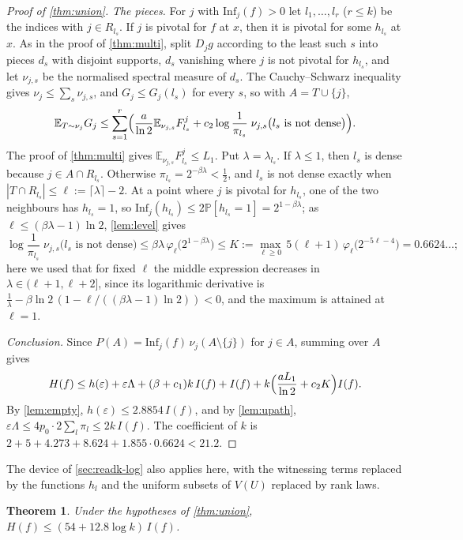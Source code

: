 \documentclass[11pt]{amsart}
\newtheorem{theorem}{Theorem}[section]
\theoremstyle{definition}
\theoremstyle{remark}
\newcommand{\E}{\mathbb{E}}
\renewcommand{\Pr}{\mathbb{P}}
\newcommand{\Inf}{\mathrm{Inf}}
\begin{document}
\begin{proof}[Proof of \cref{thm:union}]
\emph{The pieces.} For $j$ with $\Inf_j(f)>0$ let $l_1,\dots,l_r$ ($r\le k$) be the indices with $j\in R_{l_s}$. If
$j$ is pivotal for $f$ at $x$, then it is pivotal for some $h_{l_s}$ at $x$. As in the proof of \cref{thm:multi},
split $D_jg$ according to the least such $s$ into pieces $d_s$ with disjoint supports, $d_s$ vanishing where $j$ is
not pivotal for $h_{l_s}$, and let $\nu_{j,s}$ be the normalised spectral measure of $d_s$. The Cauchy--Schwarz
inequality gives $\nu_j\le\sum_s\nu_{j,s}$, and $G_j\le G_j(l_s)$ for every $s$, so with $A=T\cup\{j\}$,
\[
\E_{T\sim\nu_j}G_j\le\sum_{s=1}^r\Bigl(\frac a{\ln2}\E_{\nu_{j,s}}F^j_{l_s}+c_2\log\frac1{\pi_{l_s}}\;
\nu_{j,s}\bigl(l_s\text{ is not dense}\bigr)\Bigr).
\]
The proof of \cref{thm:multi} gives $\E_{\nu_{j,s}}F^j_{l_s}\le L_1$. Put $\lambda=\lambda_{l_s}$. If $\lambda\le1$, then
$l_s$ is dense because $j\in A\cap R_{l_s}$. Otherwise $\pi_{l_s}=2^{-\beta\lambda}<\frac12$, and $l_s$ is not dense
exactly when $|T\cap R_{l_s}|\le\ell:=\lceil\lambda\rceil-2$. At a point where $j$ is pivotal for $h_{l_s}$, one of
the two neighbours has $h_{l_s}=1$, so $\Inf_j(h_{l_s})\le2\Pr[h_{l_s}=1]=2^{1-\beta\lambda}$; as
$\ell\le(\beta\lambda-1)\ln2$, \cref{lem:level} gives
\[
\log\frac1{\pi_{l_s}}\;\nu_{j,s}\bigl(l_s\text{ is not dense}\bigr)\le\beta\lambda\,\varphi_\ell\bigl(2^{1-\beta\lambda}\bigr)
\le K:=\max_{\ell\ge0}\,5(\ell+1)\,\varphi_\ell\bigl(2^{-5\ell-4}\bigr)=0.6624\ldots;
\]
here we used that for fixed $\ell$ the middle expression decreases in $\lambda\in(\ell+1,\ell+2]$, since its
logarithmic derivative is $\frac1\lambda-\beta\ln2\,(1-\ell/((\beta\lambda-1)\ln2))<0$, and the maximum is attained at
$\ell=1$.

\emph{Conclusion.} Since $P(A)=\Inf_j(f)\,\nu_j(A\setminus\{j\})$ for $j\in A$, summing over $A$ gives
\[
H(f)\le h(\varepsilon)+\varepsilon\Lambda+(\beta+c_1)k\,I(f)+I(f)+k\Bigl(\frac{aL_1}{\ln2}+c_2K\Bigr)I(f).
\]
By \cref{lem:empty}, $h(\varepsilon)\le2.8854\,I(f)$, and by \cref{lem:upath},
$\varepsilon\Lambda\le4p_0\cdot2\sum_l\pi_l\le2k\,I(f)$. The coefficient of $k$ is
$2+5+4.273+8.624+1.855\cdot0.6624<21.2$.
\end{proof}

The device of \cref{sec:readk-log} also applies here, with the witnessing terms replaced by the functions $h_l$ and
the uniform subsets of $V(U)$ replaced by rank laws.

\begin{theorem}\label{thm:union-log}
Under the hypotheses of \cref{thm:union}, $H(f)\le(54+12.8\log k)\,I(f)$.
\end{theorem}
\end{document}

